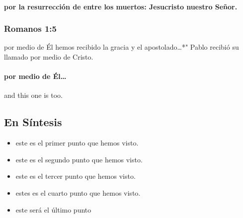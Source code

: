 

\paragraph{por la resurrección de entre los muertos: Jesucristo nuestro
Señor.}\label{por-la-resurrecciuxf3n-de-entre-los-muertos-jesucristo-nuestro-seuxf1or.}



\subsubsection{Romanos 1:5}\label{romanos-15}

\begin{verseblock}
por medio de Él hemos recibido la gracia y el apostolado…*" Pablo recibió su llamado por medio de Cristo.
\end{verseblock}

\paragraph{por medio de Él\ldots{}}\label{por-medio-de-uxe9l}



and this one is too.

\subsection{En Síntesis}\label{en-suxedntesis}

\begin{commentblock}

\begin{itemize}
\tightlist
\item
  este es el primer punto que hemos visto.
\item
  este es el segundo punto que hemos visto.
\item
  este es el tercer punto que hemos visto.
\item
  estes es el cuarto punto que hemos visto.
\item
  este será el último punto
\end{itemize}

\end{commentblock}
